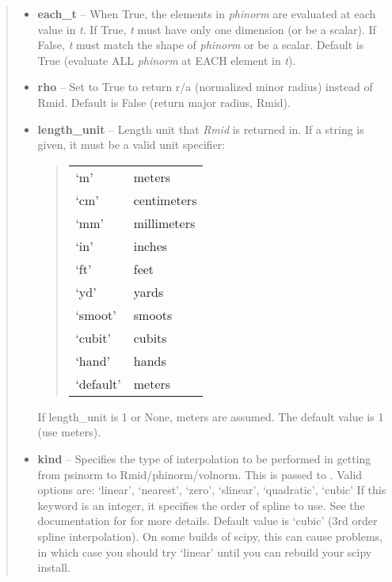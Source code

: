 \documentclass[letterpaper,10pt,english]{sphinxmanual}
\begin{document}
\begin{fulllineitems}
\begin{fulllineitems}
\begin{quote}
\begin{description}
\begin{itemize}
\item {} 
\textbf{each\_t} -- When True, the elements in \emph{phinorm} are evaluated at
each value in \emph{t}. If True, \emph{t} must have only one dimension (or
be a scalar). If False, \emph{t} must match the shape of \emph{phinorm} or be
a scalar. Default is True (evaluate ALL \emph{phinorm} at EACH element in
\emph{t}).

\item {} 
\textbf{rho} -- Set to True to return r/a (normalized minor radius)
instead of Rmid. Default is False (return major radius, Rmid).

\item {} 
\textbf{length\_unit} -- 
Length unit that \emph{Rmid} is returned in.
If a string is given, it must be a valid unit specifier:
\begin{quote}

\begin{tabulary}{\linewidth}{|L|L|}
\hline

`m'
 & 
meters
\\

`cm'
 & 
centimeters
\\

`mm'
 & 
millimeters
\\

`in'
 & 
inches
\\

`ft'
 & 
feet
\\

`yd'
 & 
yards
\\

`smoot'
 & 
smoots
\\

`cubit'
 & 
cubits
\\

`hand'
 & 
hands
\\

`default'
 & 
meters
\\
\hline\end{tabulary}

\end{quote}

If length\_unit is 1 or None, meters are assumed. The default
value is 1 (use meters).


\item {} 
\textbf{kind} -- Specifies the type of
interpolation to be performed in getting from psinorm to
Rmid/phinorm/volnorm. This is passed to
. Valid options are:
`linear', `nearest', `zero', `slinear', `quadratic', `cubic'
If this keyword is an integer, it specifies the order of spline
to use. See the documentation for  for more
details. Default value is `cubic' (3rd order spline
interpolation). On some builds of scipy, this can cause problems,
in which case you should try `linear' until you can rebuild your
scipy install.


\end{itemize}
\end{description}
\end{quote}
\end{fulllineitems}
\end{fulllineitems}
\end{document}
